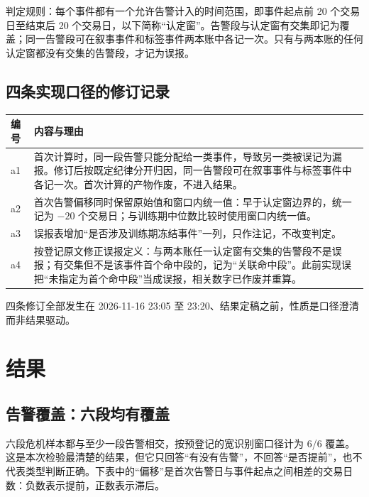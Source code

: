 \documentclass[12pt,a4paper]{ctexart}
\begin{document}
判定规则：每个事件都有一个允许告警计入的时间范围，即事件起点前 20 个交易日至结束后 20 个交易日，以下简称“认定窗”。告警段与认定窗有交集即记为覆盖；同一告警段可在叙事事件和标签事件两本账中各记一次。只有与两本账的任何认定窗都没有交集的告警段，才记为误报。

\subsection{四条实现口径的修订记录}

\begin{center}\small
\begin{tabularx}{\textwidth}{@{}>{\raggedright\arraybackslash}p{1.0cm}Y@{}}
\toprule
\textbf{编号} & \textbf{内容与理由} \\
\midrule
a1 & 首次计算时，同一段告警只能分配给一类事件，导致另一类被误记为漏报。修订后按既定纪律分开归因，同一告警段可在叙事事件与标签事件中各记一次。首次计算的产物作废，不进入结果。\\
a2 & 首次告警偏移同时保留原始值和窗口内统一值：早于认定窗边界的，统一记为 $-20$ 个交易日；与训练期中位数比较时使用窗口内统一值。\\
a3 & 误报表增加“是否涉及训练期冻结事件”一列，只作注记，不改变判定。\\
a4 & 按登记原文修正误报定义：与两本账任一认定窗有交集的告警段不是误报；有交集但不是该事件首个命中段的，记为“关联命中段”。此前实现误把“未指定为首个命中段”当成误报，相关数字已作废并重算。\\
\bottomrule
\end{tabularx}
\end{center}

四条修订全部发生在 2026-11-16 23:05 至 23:20、结果定稿之前，性质是口径澄清而非结果驱动。

\section{结果}

\subsection{告警覆盖：六段均有覆盖}

六段危机样本都与至少一段告警相交，按预登记的宽识别窗口径计为 6/6 覆盖。这是本次检验最清楚的结果，但它只回答“有没有告警”，不回答“是否提前”，也不代表类型判断正确。下表中的“偏移”是首次告警日与事件起点之间相差的交易日数：负数表示提前，正数表示滞后。
\end{document}

